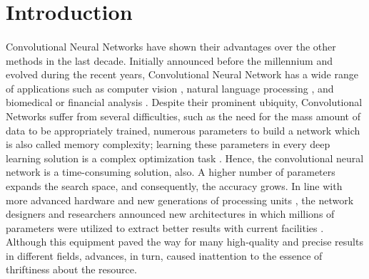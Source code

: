 \documentclass{report}
\begin{document}
\section{Introduction}

\paragraph*{}
Convolutional Neural Networks have shown their advantages over the other methods in the last decade. Initially announced before the millennium
\cite{hinton}
and evolved during the recent years, Convolutional Neural Network has a wide range of applications such as computer vision
\cite{vis2,vis1,vis3}
, natural language processing
\cite{nlp2,nlp1}
, and biomedical
\cite{bio1,bio2}
or financial analysis
\cite{fin2,fin1}
. Despite their prominent  ubiquity, Convolutional Networks suffer from several difficulties, such as the need for the mass amount of data to be appropriately trained, numerous parameters to build a network which is also called memory complexity; learning these parameters in every deep learning solution is a complex optimization task
\cite{danish}
. Hence, the convolutional neural network is a time-consuming solution, also. A higher number of parameters expands the search space, and consequently, the accuracy grows. In line with more advanced hardware and new generations of processing units
\cite{gpu}
, the network designers and researchers announced new architectures in which millions of parameters were utilized to extract better results with current facilities
\cite{mobilenets,alexnet,resnets,vgg}
. Although this equipment paved the way for many high-quality and precise results in different fields, advances, in turn, caused inattention to the essence of thriftiness about the resource.
\end{document}
